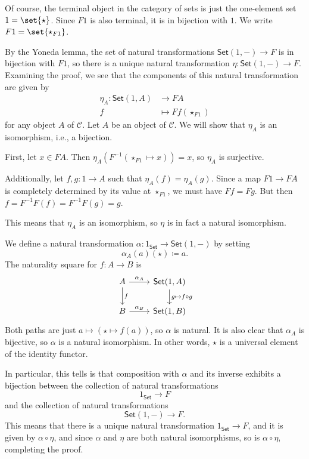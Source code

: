 Of course, the terminal object in the category of sets is just the one-element set
$1 = \set{\star}$.
Since $F1$ is also terminal, it is in bijection with $1$. We write
$F1 = \set{\star_{F1}}$.

By the Yoneda lemma, the set of natural transformations
$\mathsf{Set}(1, {-}) \to F$
is in bijection with $F1$, so there is a unique natural transformation
$\eta\colon \mathsf{Set}(1, {-}) \to F$.  Examining the proof, we see that the
components of this natural transformation are given by
\begin{align*}
	\eta_A \colon \mathsf{Set}(1, A)&\to FA\\
	f&\mapsto Ff(\star_{F1})
\end{align*}
for any object $A$ of $\mathcal{C}$. Let $A$ be an object of $\mathcal{C}$.
We will show that $\eta_A$ is an isomorphism, i.e., a bijection.

First, let $x \in FA$. Then
$\eta_A(F^{-1}(\star_{F1}\mapsto x)) = x$, so $\eta_A $ is surjective.

Additionally, let $f, g \colon 1\to A$ such that $\eta_A(f) = \eta_A(g)$. Since
a map $F1\to FA$ is completely determined by its value at $\star_{F1}$, we must
have $Ff = Fg$. But then $f = F^{-1}F(f) = F^{-1}F(g) = g$.

This means that $\eta_A$ is an isomorphism, so $\eta$ is in fact a natural
isomorphism.

We define a natural transformation $\alpha\colon 1_{\mathsf{Set}}\to \mathsf{Set}(1,{-})$
by setting \[ \alpha_A(a)(\star)\coloneqq a. \]
The naturality square for $f\colon A\to B$ is
\[\begin{tikzcd}
	A\ar[r, "\alpha_A"]\ar[d, "f"] & \mathsf{Set}(1, A)\ar[d, "g\mapsto f \circ g"]\\
	B\ar[r, "\alpha_B"] &\mathsf{Set}(1, B)
\end{tikzcd}\]
Both paths are just $a \mapsto (\star \mapsto f(a))$, so $\alpha$ is natural.
It is also clear that $\alpha_A$ is bijective, so $\alpha$ is a natural isomorphism.
In other words, $\star$ is a universal element of the identity functor.

In particular, this tells is that composition with $\alpha$ and its inverse
exhibits a bijection between
the collection of natural transformations
\[ 1_{\mathsf{Set}} \to F \]
and the collection of natural transformations
\[ \mathsf{Set}(1, {-}) \to F. \]
This means that there is a unique natural transformation $1_{\mathsf{Set}}\to F$,
and it is given by $\alpha \circ \eta$, and since $\alpha$ and $\eta$ are both
natural isomorphisms, so is $\alpha \circ \eta$, completing the proof.

